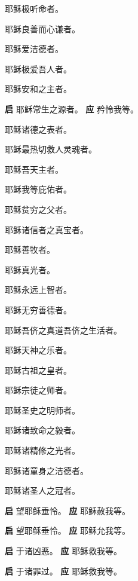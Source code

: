 \documentclass[UTF8,17pt]{ctexart}
\begin{document}
 耶稣极听命者。

 耶稣良善而心谦者。

 耶稣爱洁德者。

 耶稣极爱吾人者。

 耶稣安和之主者。

\textbf{启} \quad 耶稣常生之源者。 \hfill \textbf{应} \quad 矜怜我等。

 耶稣诸德之表者。 

 耶稣最热切救人灵魂者。 

 耶稣吾天主者。

 耶稣我等庇佑者。

 耶稣贫穷之父者。 

 耶稣诸信者之真宝者。 

 耶稣善牧者。

 耶稣真光者。

 耶稣永远上智者。

 耶稣无穷善德者。

 耶稣吾侪之真道吾侪之生活者。

 耶稣天神之乐者。

 耶稣古祖之皇者。

 耶稣宗徒之师者。 

 耶稣圣史之明师者。 

 耶稣诸致命之毅者。 

 耶稣诸精修之光者。 

 耶稣诸童身之洁德者。

 耶稣诸圣人之冠者。

\textbf{启} \quad 望耶稣垂怜。 \hfill  \textbf{应} \quad 耶稣赦我等。

\textbf{启} \quad 望耶稣垂怜。 \hfill  \textbf{应} \quad 耶稣允我等。

\textbf{启} \quad 于诸凶恶。 \hfill  \textbf{应} \quad  耶稣救我等。 

\textbf{启} \quad 于诸罪过。 \hfill  \textbf{应} \quad  耶稣救我等。 
\end{document}

